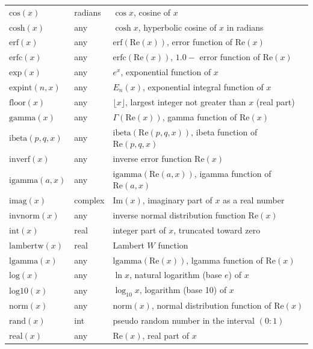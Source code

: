 \documentclass[
  hyper, lang=cn, 
  class=l3dox, 
]{../../zlatex/code/ztex}
\begin{document}
\begin{center}
\begin{longtable}{lll}
    \(\text{cos}(x)\) & radians & $\cos x$, cosine of $x$ \\
    \(\text{cosh}(x)\) & any & $\cosh x$, hyperbolic cosine of $x$ in radians \\
    \(\text{erf}(x)\) & any & $\text{erf}(\text{Re}(x))$, error function of $\text{Re}(x)$ \\
    \(\text{erfc}(x)\) & any & $\text{erfc}(\text{Re}(x))$, $1.0 - $ error function of $\text{Re}(x)$ \\
    \(\text{exp}(x)\) & any & $e^x$, exponential function of $x$ \\
    \(\text{expint}(n,x)\) & any & $E_n(x)$, exponential integral function of $x$ \\
    \(\text{floor}(x)\) & any & $\lfloor x \rfloor$, largest integer not greater than $x$ (real part) \\
    \(\text{gamma}(x)\) & any & $\Gamma(\text{Re}(x))$, gamma function of $\text{Re}(x)$ \\
    \(\text{ibeta}(p,q,x)\) & any & $\text{ibeta}(\text{Re}(p,q,x))$, ibeta function of $\text{Re}(p,q,x)$ \\
    \(\text{inverf}(x)\) & any & inverse error function $\text{Re}(x)$ \\
    \(\text{igamma}(a,x)\) & any & $\text{igamma}(\text{Re}(a,x))$, igamma function of $\text{Re}(a,x)$ \\
    \(\text{imag}(x)\) & complex & $\text{Im}(x)$, imaginary part of $x$ as a real number \\
    \(\text{invnorm}(x)\) & any & inverse normal distribution function $\text{Re}(x)$ \\
    \(\text{int}(x)\) & real & integer part of $x$, truncated toward zero \\
    \(\text{lambertw}(x)\) & real & Lambert $W$ function \\
    \(\text{lgamma}(x)\) & any & $\text{lgamma}(\text{Re}(x))$, lgamma function of $\text{Re}(x)$ \\
    \(\text{log}(x)\) & any & $\ln x$, natural logarithm (base $e$) of $x$ \\
    \(\text{log10}(x)\) & any & $\log_{10} x$, logarithm (base 10) of $x$ \\
    \(\text{norm}(x)\) & any & $\text{norm}(x)$, normal distribution function of $\text{Re}(x)$ \\
    \(\text{rand}(x)\) & int & pseudo random number in the interval $(0:1)$ \\
    \(\text{real}(x)\) & any & $\text{Re}(x)$, real part of $x$ \\

\end{longtable}
\end{center}
\end{document}
